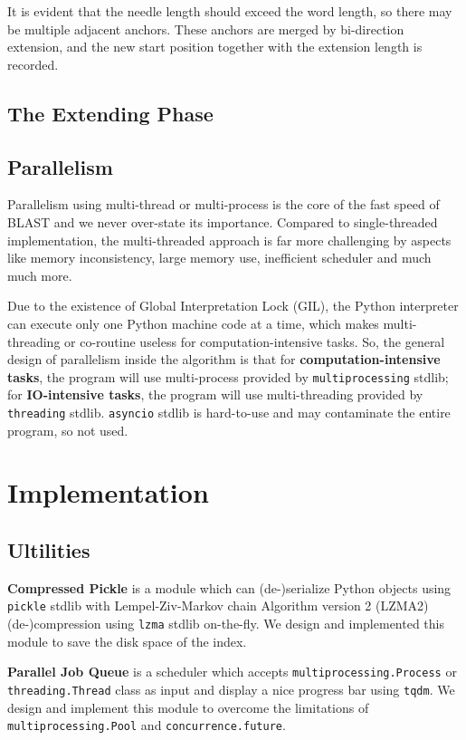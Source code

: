 \documentclass[10pt,final,journal,twocolumn,a4paper]{IEEEtran}
\begin{document}
It is evident that the needle length should exceed the word length, so there may be multiple adjacent anchors. These anchors are merged by bi-direction extension, and the new start position together with the extension length is recorded.

\subsection{The \textbf{Extending} Phase}

\subsection{Parallelism}

Parallelism using multi-thread or multi-process is the core of the fast speed of BLAST and we never over-state its importance. Compared to single-threaded implementation, the multi-threaded approach is far more challenging by aspects like memory inconsistency, large memory use, inefficient scheduler and much much more.

Due to the existence of Global Interpretation Lock (GIL), the Python interpreter can execute only one Python machine code at a time, which makes multi-threading or co-routine useless for computation-intensive tasks. So, the general design of parallelism inside the algorithm is that for \textbf{computation-intensive tasks}, the program will use multi-process provided by \verb|multiprocessing| stdlib; for \textbf{IO-intensive tasks}, the program will use multi-threading provided by \verb|threading| stdlib. \verb|asyncio| stdlib is hard-to-use and may contaminate the entire program, so not used.



\section{Implementation}

\subsection{Ultilities}

\textbf{Compressed Pickle} is a module which can (de-)serialize Python objects using \verb|pickle| stdlib with Lempel-Ziv-Markov chain Algorithm version 2 (LZMA2) (de-)compression using \verb|lzma| stdlib on-the-fly. We design and implemented this module to save the disk space of the index.

\textbf{Parallel Job Queue} is a scheduler which accepts \verb|multiprocessing.Process| or \verb|threading.Thread| class as input and display a nice progress bar using \verb|tqdm|. We design and implement this module to overcome the limitations of \verb|multiprocessing.Pool| and \verb|concurrence.future|.
\end{document}
